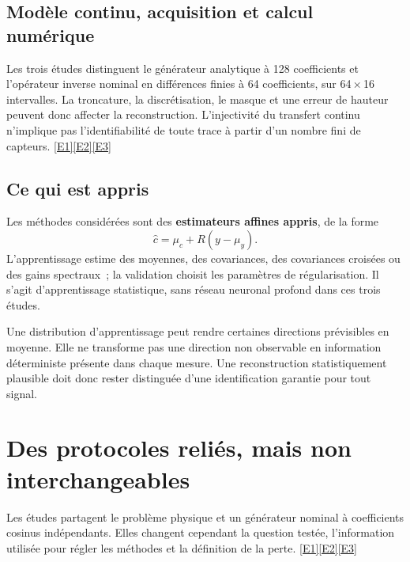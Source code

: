 \documentclass[11pt,a4paper]{article}
\DeclareRobustCommand{\eref}[1]{\hyperlink{ref#1}{[#1]}}
\begin{document}
\subsection*{Modèle continu, acquisition et calcul numérique}
Les trois études distinguent le générateur analytique à 128 coefficients et l'opérateur inverse
nominal en différences finies à 64 coefficients, sur 64\,$\times$\,16 intervalles. La troncature,
la discrétisation, le masque et une erreur de hauteur peuvent donc affecter la reconstruction.
L'injectivité du transfert continu n'implique pas l'identifiabilité de toute trace à partir d'un
nombre fini de capteurs. \eref{E1}\eref{E2}\eref{E3}

\subsection*{Ce qui est appris}
Les méthodes considérées sont des \textbf{estimateurs affines appris}, de la forme
\[
\widehat c=\mu_c+R(y-\mu_y).
\]
L'apprentissage estime des moyennes, des covariances, des covariances croisées ou des gains
spectraux~; la validation choisit les paramètres de régularisation. Il s'agit d'apprentissage
statistique, sans réseau neuronal profond dans ces trois études.

\begin{keybox}
Une distribution d'apprentissage peut rendre certaines directions prévisibles en moyenne.
Elle ne transforme pas une direction non observable en information déterministe présente
dans chaque mesure. Une reconstruction statistiquement plausible doit donc rester distinguée
d'une identification garantie pour tout signal.
\end{keybox}

\newpage
\section{Des protocoles reliés, mais non interchangeables}
Les études partagent le problème physique et un générateur nominal à coefficients cosinus
indépendants. Elles changent cependant la question testée, l'information utilisée pour régler
les méthodes et la définition de la perte. \eref{E1}\eref{E2}\eref{E3}
\end{document}
